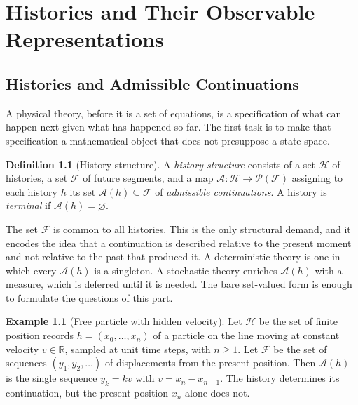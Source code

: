 \documentclass[11pt,oneside]{book}
\theoremstyle{definition}
\newtheorem{definition}[theorem]{Definition}
\newtheorem{example}[theorem]{Example}
\theoremstyle{remark}
\newcommand{\Hist}{\mathcal{H}}
\newcommand{\Fut}{\mathcal{F}}
\newcommand{\Adm}{\mathcal{A}}
\newcommand{\R}{\mathbb{R}}
\begin{document}
\mainmatter

\part{Histories and Their Observable Representations}

\chapter{Histories and Admissible Continuations}\label{ch:hist-cont}

A physical theory, before it is a set of equations, is a specification of what can happen next given what has happened so far. The first task is to make that specification a mathematical object that does not presuppose a state space.

\begin{definition}[History structure]
A \emph{history structure} consists of a set $\Hist$ of histories, a set $\Fut$ of future segments, and a map $\Adm\colon \Hist\to\mathcal P(\Fut)$ assigning to each history $h$ its set $\Adm(h)\subseteq\Fut$ of \emph{admissible continuations}. A history is \emph{terminal} if $\Adm(h)=\varnothing$.
\end{definition}

The set $\Fut$ is common to all histories. This is the only structural demand, and it encodes the idea that a continuation is described relative to the present moment and not relative to the past that produced it. A deterministic theory is one in which every $\Adm(h)$ is a singleton. A stochastic theory enriches $\Adm(h)$ with a measure, which is deferred until it is needed. The bare set-valued form is enough to formulate the questions of this part.

\begin{example}[Free particle with hidden velocity]
Let $\Hist$ be the set of finite position records $h=(x_0,\dots,x_n)$ of a particle on the line moving at constant velocity $v\in\R$, sampled at unit time steps, with $n\ge 1$. Let $\Fut$ be the set of sequences $(y_1,y_2,\dots)$ of displacements from the present position. Then $\Adm(h)$ is the single sequence $y_k=kv$ with $v=x_n-x_{n-1}$. The history determines its continuation, but the present position $x_n$ alone does not.
\end{example}
\end{document}
